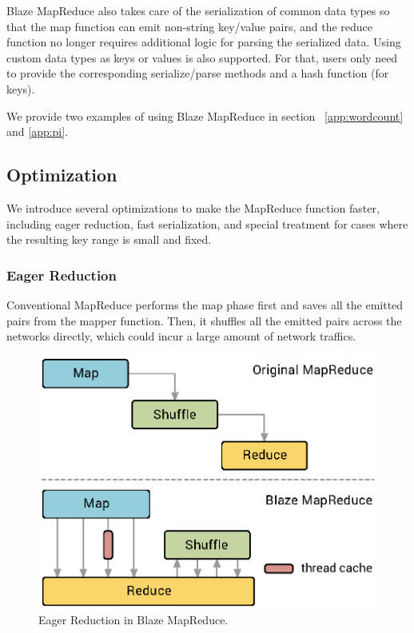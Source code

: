 Blaze MapReduce also takes care of the serialization of common data types so that the map function can emit non-string key/value pairs, and the reduce function no longer requires additional logic for parsing the serialized data.
Using custom data types as keys or values is also supported. For that, users only need to provide the corresponding serialize/parse methods and a hash function (for keys).

We provide two examples of using Blaze MapReduce in section ~\ref{app:wordcount} and \ref{app:pi}.

\subsection{Optimization}
\label{sec:opt}
We introduce several optimizations to make the MapReduce function faster, including eager reduction, fast serialization, and special treatment for cases where the resulting key range is small and fixed.

\subsubsection{Eager Reduction}

Conventional MapReduce performs the map phase first and saves all the emitted pairs from the mapper function.
Then, it shuffles all the emitted pairs across the networks directly, which could incur a large amount of network traffics.

\begin{figure}
  \begin{center}
  \includegraphics[width=0.7\linewidth]{figs/mrDiff0.eps}
  \end{center}
  \vspace{-0.2cm}
  \caption{Eager Reduction in Blaze MapReduce.
  }
  \label{fig:mrdiff}
\end{figure}

